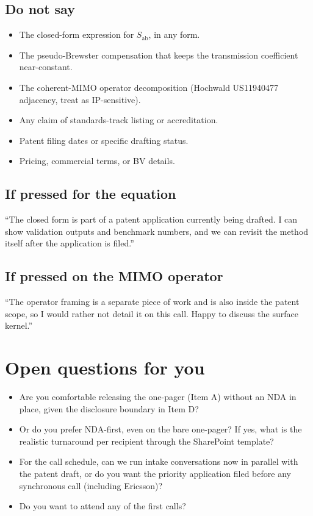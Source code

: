 \documentclass[11pt,a4paper]{article}
\begin{document}
\subsection*{Do not say}
\begin{itemize}
  \item The closed-form expression for $S_\mathrm{ab}$, in any form.
  \item The pseudo-Brewster compensation that keeps the transmission coefficient near-constant.
  \item The coherent-MIMO operator decomposition (Hochwald US11940477 adjacency, treat as IP-sensitive).
  \item Any claim of standards-track listing or accreditation.
  \item Patent filing dates or specific drafting status.
  \item Pricing, commercial terms, or BV details.
\end{itemize}

\subsection*{If pressed for the equation}
``The closed form is part of a patent application currently being drafted. I can show validation outputs and benchmark numbers, and we can revisit the method itself after the application is filed.''

\subsection*{If pressed on the MIMO operator}
``The operator framing is a separate piece of work and is also inside the patent scope, so I would rather not detail it on this call. Happy to discuss the surface kernel.''

\vspace{0.8em}

\section*{Open questions for you}
\begin{itemize}
  \item Are you comfortable releasing the one-pager (Item A) without an NDA in place, given the disclosure boundary in Item D?
  \item Or do you prefer NDA-first, even on the bare one-pager? If yes, what is the realistic turnaround per recipient through the SharePoint template?
  \item For the call schedule, can we run intake conversations now in parallel with the patent draft, or do you want the priority application filed before any synchronous call (including Ericsson)?
  \item Do you want to attend any of the first calls?
\end{itemize}
\end{document}
